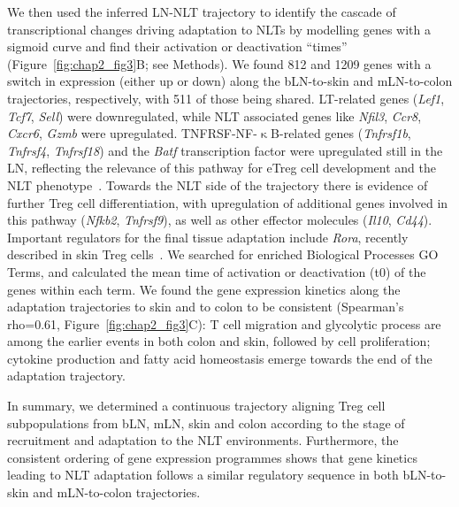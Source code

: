 We then used the inferred LN-NLT trajectory to identify the cascade of transcriptional changes driving adaptation to NLTs by modelling genes with a sigmoid curve and find their activation or deactivation “times” (Figure~\ref{fig:chap2_fig3}B; see Methods). We found 812 and 1209 genes with a switch in expression (either up or down) along the bLN-to-skin and mLN-to-colon trajectories, respectively, with 511 of those being shared. LT-related genes (\textit{Lef1}, \textit{Tcf7}, \textit{Sell}) were downregulated, while NLT associated genes like \textit{Nfil3}, \textit{Ccr8}, \textit{Cxcr6}, \textit{Gzmb} were upregulated. TNFRSF-NF-${\upkappa}$B-related genes (\textit{Tnfrsf1b}, \textit{Tnfrsf4}, \textit{Tnfrsf18}) and the \textit{Batf} transcription factor were upregulated still in the LN, reflecting the relevance of this pathway for eTreg cell development and the NLT phenotype~\citep{Vasanthakumar2017-ib,Vasanthakumar2015-jw}. Towards the NLT side of the trajectory there is evidence of further Treg cell differentiation, with upregulation of additional genes involved in this pathway (\textit{Nfkb2}, \textit{Tnfrsf9}), as well as other effector molecules (\textit{Il10}, \textit{Cd44}). Important regulators for the final tissue adaptation include \textit{Rora}, recently described in skin Treg cells~\citep{Malhotra2018-nz}. We searched for enriched Biological Processes GO Terms, and calculated the mean time of activation or deactivation (t0) of the genes within each term. We found the gene expression kinetics along the adaptation trajectories to skin and to colon to be consistent (Spearman’s rho=0.61, Figure~\ref{fig:chap2_fig3}C): T cell migration and glycolytic process are among the earlier events in both colon and skin, followed by cell proliferation; cytokine production and fatty acid homeostasis emerge towards the end of the adaptation trajectory.

In summary, we determined a continuous trajectory aligning Treg cell subpopulations from bLN, mLN, skin and colon according to the stage of recruitment and adaptation to the NLT environments. Furthermore, the consistent ordering of gene expression programmes shows that gene kinetics leading to NLT adaptation follows a similar regulatory sequence in both bLN-to-skin and mLN-to-colon trajectories.


